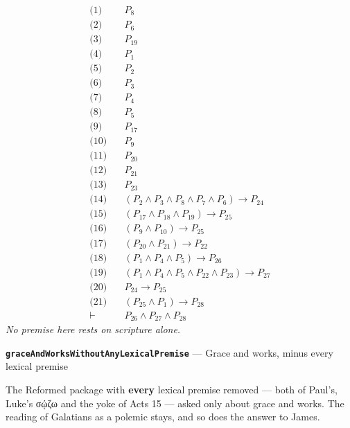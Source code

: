 \documentclass[11pt]{article}
\begin{document}
\begin{align*}
  \text{(1)} \quad & P_{8} \\
  \text{(2)} \quad & P_{6} \\
  \text{(3)} \quad & P_{19} \\
  \text{(4)} \quad & P_{1} \\
  \text{(5)} \quad & P_{2} \\
  \text{(6)} \quad & P_{3} \\
  \text{(7)} \quad & P_{4} \\
  \text{(8)} \quad & P_{5} \\
  \text{(9)} \quad & P_{17} \\
  \text{(10)} \quad & P_{9} \\
  \text{(11)} \quad & P_{20} \\
  \text{(12)} \quad & P_{21} \\
  \text{(13)} \quad & P_{23} \\
  \text{(14)} \quad & (P_{2} \land P_{3} \land P_{8} \land P_{7} \land P_{6}) \rightarrow P_{24} \\
  \text{(15)} \quad & (P_{17} \land P_{18} \land P_{19}) \rightarrow P_{25} \\
  \text{(16)} \quad & (P_{9} \land P_{10}) \rightarrow P_{25} \\
  \text{(17)} \quad & (P_{20} \land P_{21}) \rightarrow P_{22} \\
  \text{(18)} \quad & (P_{1} \land P_{4} \land P_{5}) \rightarrow P_{26} \\
  \text{(19)} \quad & (P_{1} \land P_{4} \land P_{5} \land P_{22} \land P_{23}) \rightarrow P_{27} \\
  \text{(20)} \quad & P_{24} \rightarrow P_{25} \\
  \text{(21)} \quad & (P_{25} \land P_{1}) \rightarrow P_{28} \\
  \vdash \quad & P_{26} \land P_{27} \land P_{28}
\end{align*}
\emph{No premise here rests on scripture alone.}
\par\medskip\noindent\textbf{\texttt{grace\allowbreak{}And\allowbreak{}Works\allowbreak{}Without\allowbreak{}Any\allowbreak{}Lexical\allowbreak{}Premise}} --- Grace and works, minus every lexical premise\par\nobreak\noindent
The Reformed package with \textbf{every} lexical premise removed — both of Paul's, Luke's σῴζω and the yoke of Acts 15 — asked only about grace and works. The reading of Galatians as a polemic stays, and so does the answer to James.
\end{document}
